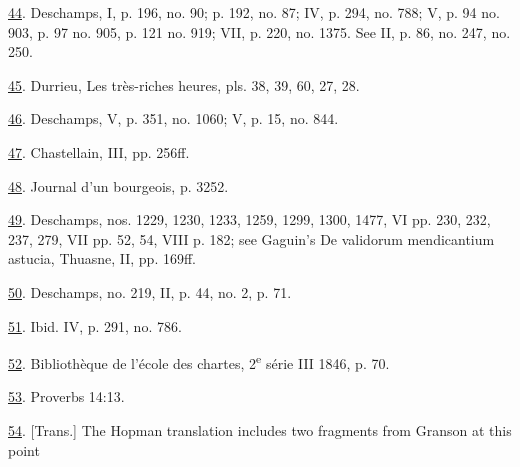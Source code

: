 \protect\hypertarget{23_NOTES.xhtmlux5cux23id_224}{\protect\hyperlink{21_Chapter_Thirteen__IMAGE_AND_WORD.xhtmlux5cux23id_223}{44}}.
Deschamps, I, p. 196, no. 90; p. 192, no. 87; IV, p. 294, no. 788; V, p.
94 no. 903, p. 97 no. 905, p. 121 no. 919; VII, p. 220, no. 1375. See
II, p. 86, no. 247, no. 250.

\protect\hypertarget{23_NOTES.xhtmlux5cux23id_222}{\protect\hyperlink{21_Chapter_Thirteen__IMAGE_AND_WORD.xhtmlux5cux23id_221}{45}}.
Durrieu, Les très-riches heures, pls. 38, 39, 60, 27, 28.

\protect\hypertarget{23_NOTES.xhtmlux5cux23id_220}{\protect\hyperlink{21_Chapter_Thirteen__IMAGE_AND_WORD.xhtmlux5cux23id_219}{46}}.
Deschamps, V, p. 351, no. 1060; V, p. 15, no. 844.

\protect\hypertarget{23_NOTES.xhtmlux5cux23id_218}{\protect\hyperlink{21_Chapter_Thirteen__IMAGE_AND_WORD.xhtmlux5cux23id_217}{47}}.
Chastellain, III, pp. 256ff.

\protect\hypertarget{23_NOTES.xhtmlux5cux23id_216}{\protect\hyperlink{21_Chapter_Thirteen__IMAGE_AND_WORD.xhtmlux5cux23id_215}{48}}.
Journal d'un bourgeois, p. 3252.

\protect\hypertarget{23_NOTES.xhtmlux5cux23page_437}{\protect\hyperlink{21_Chapter_Thirteen__IMAGE_AND_WORD.xhtmlux5cux23id_214}{49}}.
Deschamps, nos. 1229, 1230, 1233, 1259, 1299, 1300, 1477, VI pp. 230,
232, 237, 279, VII pp. 52, 54, VIII p. 182; see Gaguin's De validorum
mendicantium astucia, Thuasne, II, pp. 169ff.

\protect\hypertarget{23_NOTES.xhtmlux5cux23id_213}{\protect\hyperlink{21_Chapter_Thirteen__IMAGE_AND_WORD.xhtmlux5cux23id_212}{50}}.
Deschamps, no. 219, II, p. 44, no. 2, p. 71.

\protect\hypertarget{23_NOTES.xhtmlux5cux23id_211}{\protect\hyperlink{21_Chapter_Thirteen__IMAGE_AND_WORD.xhtmlux5cux23id_210}{51}}.
Ibid. IV, p. 291, no. 786.

\protect\hypertarget{23_NOTES.xhtmlux5cux23id_209}{\protect\hyperlink{21_Chapter_Thirteen__IMAGE_AND_WORD.xhtmlux5cux23id_208}{52}}.
Bibliothèque de l'école des chartes, 2\textsuperscript{e} série III
1846, p. 70.

\protect\hypertarget{23_NOTES.xhtmlux5cux23id_207}{\protect\hyperlink{21_Chapter_Thirteen__IMAGE_AND_WORD.xhtmlux5cux23id_206}{53}}.
Proverbs 14:13.

\protect\hypertarget{23_NOTES.xhtmlux5cux23id_205}{\protect\hyperlink{21_Chapter_Thirteen__IMAGE_AND_WORD.xhtmlux5cux23id_204}{54}}.
{[}Trans.{]} The Hopman translation includes two fragments from Granson
at this point

